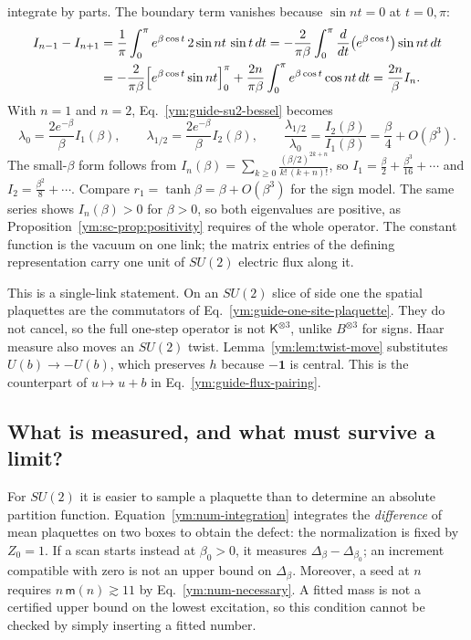 integrate by parts. The boundary term vanishes because $\sin nt=0$ at $t=0,\pi$:
\begin{align}
 I_{n-1}-I_{n+1}
 &=\frac1\pi\int_0^\pi e^{\beta\cos t}\,2\sin nt\,\sin t\,dt
 =-\frac{2}{\pi\beta}\int_0^\pi\frac{d}{dt}\big(e^{\beta\cos t}\big)\sin nt\,dt\notag\\
 &=-\frac{2}{\pi\beta}\Big[e^{\beta\cos t}\sin nt\Big]_0^\pi
   +\frac{2n}{\pi\beta}\int_0^\pi e^{\beta\cos t}\cos nt\,dt
 =\frac{2n}\beta I_n .\label{ym:guide-bessel-recurrence}
\end{align}
With $n=1$ and $n=2$, Eq.~\eqref{ym:guide-su2-bessel} becomes
\begin{equation}\label{ym:guide-su2-ratio}
 \lambda_0=\frac{2e^{-\beta}}{\beta}I_1(\beta),\qquad
 \lambda_{1/2}=\frac{2e^{-\beta}}{\beta}I_2(\beta),\qquad
 \frac{\lambda_{1/2}}{\lambda_0}=\frac{I_2(\beta)}{I_1(\beta)}
 =\frac\beta4+O(\beta^3).
\end{equation}
The small-$\beta$ form follows from
$I_n(\beta)=\sum_{k\ge0}\frac{(\beta/2)^{2k+n}}{k!\,(k+n)!}$, so
$I_1=\frac\beta2+\frac{\beta^3}{16}+\cdots$ and
$I_2=\frac{\beta^2}8+\cdots$. Compare $r_1=\tanh\beta=\beta+O(\beta^3)$ for
the sign model. The same series shows $I_n(\beta)>0$ for $\beta>0$, so
both eigenvalues are positive, as Proposition~\ref{ym:sc-prop:positivity}
requires of the whole operator. The constant function is the vacuum on one
link; the matrix entries of the defining representation carry one unit of
$SU(2)$ electric flux along it.

This is a single-link statement. On an $SU(2)$ slice of side one the spatial
plaquettes are the commutators of Eq.~\eqref{ym:guide-one-site-plaquette}.
They do not cancel, so the full one-step operator is not
$\mathsf K^{\otimes3}$, unlike $B^{\otimes3}$ for signs. Haar measure also
moves an $SU(2)$ twist. Lemma~\ref{ym:lem:twist-move} substitutes
$U(b)\to-U(b)$, which preserves $h$ because $-\mathbf 1$ is central. This is
the counterpart of $u\mapsto u+b$ in Eq.~\eqref{ym:guide-flux-pairing}.

\subsection{What is measured, and what must survive a limit?}
For $SU(2)$ it is easier to sample a plaquette than to determine an absolute
partition function. Equation~\eqref{ym:num-integration} integrates the
\emph{difference} of mean plaquettes on two boxes to obtain the defect:
the normalization is fixed by $Z_0=1$. If a scan starts instead at
$\beta_0>0$, it measures $\Delta_\beta-\Delta_{\beta_0}$; an increment
compatible with zero is not an upper bound on $\Delta_\beta$. Moreover,
a seed at $n$ requires $n\,\mathsf m(n)\gtrsim 11$ by
Eq.~\eqref{ym:num-necessary}. A fitted mass is not a certified upper bound
on the lowest excitation, so this condition cannot be checked by simply
inserting a fitted number.

